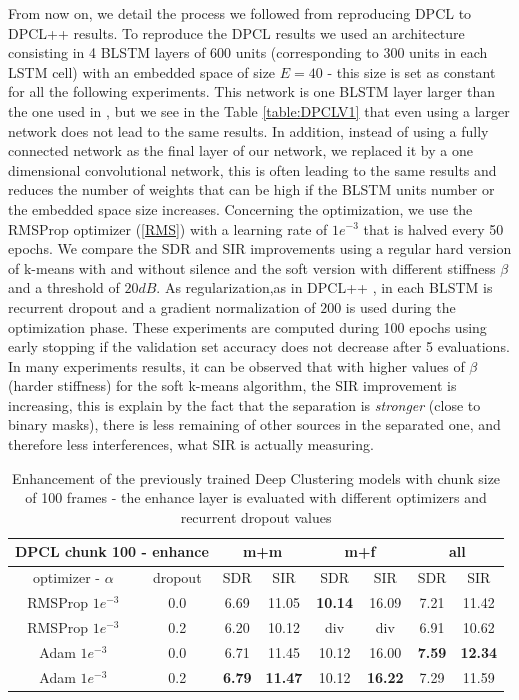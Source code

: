 \documentclass[master, tikz, final,11pt, dvipdfmx]{iscs-thesis}
\begin{document}
From now on, we detail the process we followed from reproducing DPCL \cite{DPCLV1} to DPCL++ \cite{DPCLV2} results.
To reproduce the DPCL results we used an architecture consisting in 4 BLSTM layers of 600 units (corresponding to 300 units in each LSTM cell) with an embedded space of size $E=40$ - this size is set as constant for all the following experiments. This network is one BLSTM layer larger than the one used in \cite{DPCLV1}, but we see in the Table \ref{table:DPCLV1} that even using a larger network does not lead to the same results. In addition, instead of using a fully connected network as the final layer of our network, we replaced it by a one dimensional convolutional network, this is often leading to the same results and reduces the number of weights that can be high if the BLSTM units number or the embedded space size increases. Concerning the optimization, we use the RMSProp optimizer (\ref{RMS}) with a learning rate of $1e^{-3}$ that is halved every 50 epochs. We compare the SDR and SIR improvements using a regular hard version of k-means with and without silence and the soft version with different stiffness $\beta$ and a threshold of $20dB$. As regularization,as in DPCL++ \cite{DPCLV2}, in each BLSTM is  recurrent dropout and a gradient normalization of $200$ is used during the optimization phase.
These experiments are computed during 100 epochs using early stopping if the validation set accuracy does not decrease after 5 evaluations.
In many experiments results, it can be observed that with higher values of $\beta$ (harder stiffness) for the soft k-means algorithm, the SIR improvement is increasing, this is explain by the fact that the separation is \textit{stronger} (close to binary masks), there is less remaining of other sources in the separated one, and therefore less interferences, what SIR is actually measuring.

\begin{table}[h]
\centering
\begin{tabular}{c|c|c|c|c|c|c|c}
\multicolumn{2}{c|}{DPCL chunk 100 - enhance} & \multicolumn{2}{c|}{m+m} & \multicolumn{2}{c|}{m+f} & \multicolumn{2}{c}{all} \\ 
\hline 
optimizer - $\alpha$ & dropout & SDR & SIR & SDR & SIR & SDR & SIR \\ 
\hline 
RMSProp $1e^{-3}$ & 0.0 & 6.69 & 11.05 & \textbf{10.14} & 16.09 & 7.21 & 11.42 \\ 
RMSProp $1e^{-3}$ & 0.2 & 6.20 & 10.12 & div & div & 6.91 & 10.62 \\ 
Adam $1e^{-3}$ & 0.0 & 6.71 & 11.45 & 10.12 & 16.00 & \textbf{7.59} & \textbf{12.34} \\ 
Adam $1e^{-3}$ & 0.2 &\textbf{6.79}& \textbf{11.47} & 10.12 & \textbf{16.22} & 7.29 & 11.59 \\ 
\end{tabular}
\captionsetup{justification=centering}
\caption{Enhancement of the previously trained Deep Clustering models with chunk size of 100 frames - the enhance layer is evaluated with different optimizers and recurrent dropout values}
\label{table:DPCL100enh}
\end{table}
\end{document}
